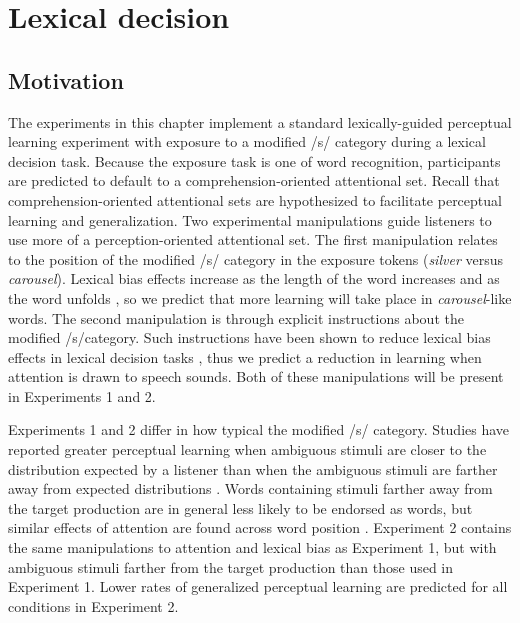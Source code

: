
\chapter{Lexical decision}
\label{chap:lexdec}

\section{Motivation}

The experiments in this chapter implement a standard lexically-guided perceptual learning experiment with exposure to a modified /s/ category during a lexical decision task.
Because the exposure task is one of word recognition, participants are predicted to default to a comprehension-oriented attentional set.  Recall that comprehension-oriented attentional sets are hypothesized to facilitate perceptual learning and generalization.
Two experimental manipulations guide listeners to use more of  a perception-oriented attentional set.
The first manipulation relates to the position of the modified /s/ category in the exposure tokens (\emph{silver} versus \emph{carousel}).
Lexical bias effects increase as the length of the word increases and as the word unfolds \citep{Pitt2006, Pitt2012}, so we predict that more learning will take place in \emph{carousel}-like words.
The second manipulation is through explicit instructions about the modified /s/category.
Such instructions have been shown to reduce lexical bias effects in lexical decision tasks \citep{Pitt2012}, thus we predict a reduction in learning when attention is drawn to speech sounds.
Both of these manipulations will be present in Experiments 1 and 2.

Experiments 1 and 2 differ in how typical the modified /s/ category.
Studies have reported greater perceptual learning when ambiguous stimuli are closer to the distribution expected by a listener than when the ambiguous stimuli are farther away from expected distributions \citep{Sumner2011}.  
Words containing stimuli farther away from the target production are in general less likely to be endorsed as words, but similar effects of attention are found across word position \citep{Pitt2012}.  
Experiment 2 contains the same manipulations to attention and lexical bias as Experiment 1, but with ambiguous stimuli farther from the target production than those used in Experiment 1.
Lower rates of generalized perceptual learning are predicted for all conditions in Experiment 2.

